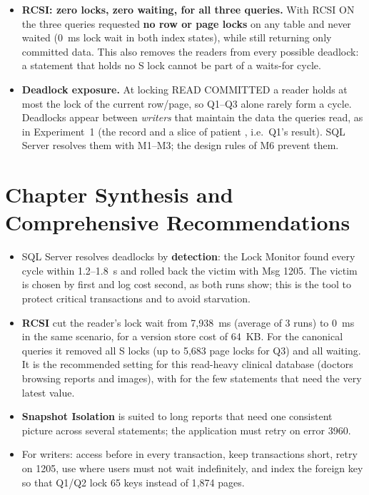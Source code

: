 \begin{itemize}
  \item \textbf{RCSI: zero locks, zero waiting, for all three queries.} With RCSI ON the three queries requested \textbf{no row or page locks} on any table and never waited (0~ms lock wait in both index states), while still returning only committed data. This also removes the readers from every possible deadlock: a statement that holds no S lock cannot be part of a waits-for cycle.

  \item \textbf{Deadlock exposure.} At locking READ COMMITTED a reader holds at most the lock of the current row/page, so Q1--Q3 alone rarely form a cycle. Deadlocks appear between \emph{writers} that maintain the data the queries read, as in Experiment~1 (the record and a slice of patient , i.e.\ Q1's result). SQL Server resolves them with M1--M3; the design rules of M6 prevent them.
\end{itemize}


\section{Chapter Synthesis and Comprehensive Recommendations}
\label{sec:r5-conclusions}
\label{sec:r5-2-summary}

\begin{itemize}
  \item SQL Server resolves deadlocks by \textbf{detection}: the Lock Monitor found every cycle within 1.2--1.8~s and rolled back the victim with Msg 1205. The victim is chosen by  first and log cost second, as both runs show; this is the tool to protect critical transactions and to avoid starvation.
  \item \textbf{RCSI} cut the reader's lock wait from 7{,}938~ms (average of 3 runs) to 0~ms in the same scenario, for a version store cost of 64~KB. For the canonical queries it removed all S locks (up to 5{,}683 page locks for Q3) and all waiting. It is the recommended setting for this read-heavy clinical database (doctors browsing reports and images), with  for the few statements that need the very latest value.
  \item \textbf{Snapshot Isolation} is suited to long reports that need one consistent picture across several statements; the application must retry on error 3960.
  \item For writers: access  before  in every transaction, keep transactions short, retry on 1205, use  where users must not wait indefinitely, and index the foreign key  so that Q1/Q2 lock 65 keys instead of 1{,}874 pages.
\end{itemize}
